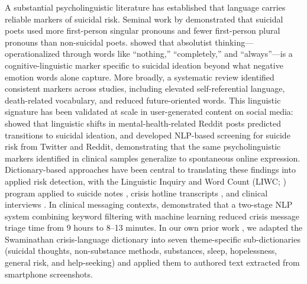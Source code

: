 \documentclass[review,12pt,authoryear]{elsarticle}
\begin{document}
A substantial psycholinguistic literature has established that language carries reliable markers of suicidal risk. Seminal work by \citet{stirman2001word} demonstrated that suicidal poets used more first-person singular pronouns and fewer first-person plural pronouns than non-suicidal poets. \citet{almosaiwi2018absolute} showed that absolutist thinking---operationalized through words like ``nothing,'' ``completely,'' and ``always''---is a cognitive-linguistic marker specific to suicidal ideation beyond what negative emotion words alone capture. More broadly, a systematic review \citep{ophir2022linguistic} identified consistent markers across studies, including elevated self-referential language, death-related vocabulary, and reduced future-oriented words. This linguistic signature has been validated at scale in user-generated content on social media: \citet{dechoudhury2016shifts} showed that linguistic shifts in mental-health-related Reddit posts predicted transitions to suicidal ideation, and \citet{coppersmith2018nlp} developed NLP-based screening for suicide risk from Twitter and Reddit, demonstrating that the same psycholinguistic markers identified in clinical samples generalize to spontaneous online expression. Dictionary-based approaches have been central to translating these findings into applied risk detection, with the Linguistic Inquiry and Word Count (LIWC; \citealt{pennebaker2015development}) program applied to suicide notes \citep{pestian2012sentiment}, crisis hotline transcripts \citep{huang2024mindsets}, and clinical interviews \citep{tausczik2010psychological}. In clinical messaging contexts, \citet{swaminathan2023nlp} demonstrated that a two-stage NLP system combining keyword filtering with machine learning reduced crisis message triage time from 9 hours to 8--13 minutes. In our own prior work \citep{ammerman2026dictionary}, we adapted the Swaminathan crisis-language dictionary \citep{swaminathan2023nlp} into seven theme-specific sub-dictionaries (suicidal thoughts, non-substance methods, substances, sleep, hopelessness, general risk, and help-seeking) and applied them to authored text extracted from smartphone screenshots.
\end{document}
